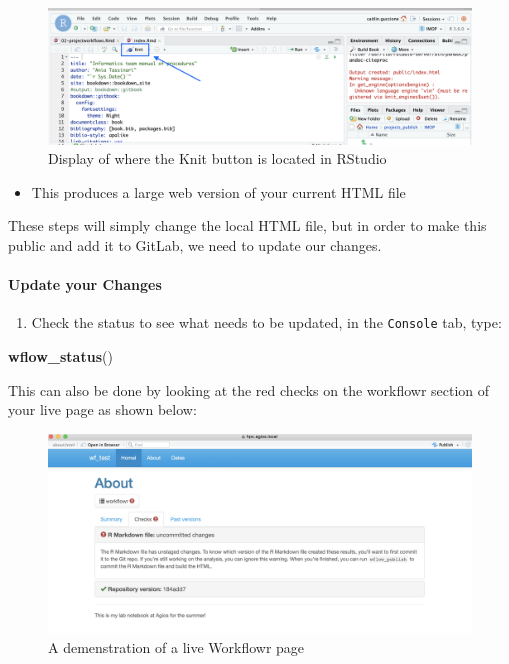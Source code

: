 \documentclass[openany]{article}
\newenvironment{Shaded}{\begin{snugshade}}{\end{snugshade}}
\newcommand{\KeywordTok}[1]{\textcolor[rgb]{0.13,0.29,0.53}{\textbf{#1}}}
\newcommand{\NormalTok}[1]{#1}
\providecommand{\tightlist}{%
  \setlength{\itemsep}{0pt}\setlength{\parskip}{0pt}}
\let\oldparagraph\paragraph
\renewcommand{\paragraph}[1]{\oldparagraph{#1}\mbox{}}
\begin{document}
\begin{figure}

{\centering \includegraphics[width=0.8\linewidth]{images/Workflow_Photos/knit_arrow} 

}

\caption{ Display of where the Knit button is located in RStudio}\label{fig:d2}
\end{figure}

\begin{itemize}
\tightlist
\item
  This produces a large web version of your current HTML file
\end{itemize}

These steps will simply change the local HTML file, but in order to make this public and add it to GitLab, we need to update our changes.

\hypertarget{update-your-changes}{%
\paragraph{Update your Changes}\label{update-your-changes}}

\begin{enumerate}
\def\labelenumi{\arabic{enumi}.}
\tightlist
\item
  Check the status to see what needs to be updated, in the \texttt{Console} tab, type:
\end{enumerate}

\begin{Shaded}
\begin{Highlighting}[]
\KeywordTok{wflow_status}\NormalTok{()}
\end{Highlighting}
\end{Shaded}

This can also be done by looking at the red checks on the workflowr section of your live page as shown below:

\begin{figure}

{\centering \includegraphics[width=0.9\linewidth]{images/Workflow_Photos/red_checks} 

}

\caption{A demenstration of a live Workflowr page}\label{fig:d4}
\end{figure}
\end{document}
